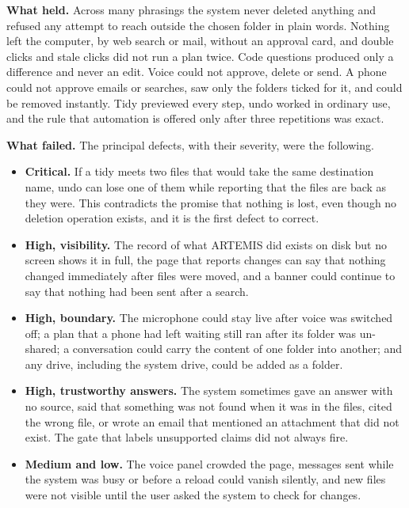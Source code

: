 \documentclass{FastFyp}
\begin{document}
\textbf{What held.} Across many phrasings the system never deleted anything and refused any attempt to reach outside the chosen folder in plain words. Nothing left the computer, by web search or mail, without an approval card, and double clicks and stale clicks did not run a plan twice. Code questions produced only a difference and never an edit. Voice could not approve, delete or send. A phone could not approve emails or searches, saw only the folders ticked for it, and could be removed instantly. Tidy previewed every step, undo worked in ordinary use, and the rule that automation is offered only after three repetitions was exact.

\textbf{What failed.} The principal defects, with their severity, were the following.
\begin{itemize}
    \item \textbf{Critical.} If a tidy meets two files that would take the same destination name, undo can lose one of them while reporting that the files are back as they were. This contradicts the promise that nothing is lost, even though no deletion operation exists, and it is the first defect to correct.
    \item \textbf{High, visibility.} The record of what ARTEMIS did exists on disk but no screen shows it in full, the page that reports changes can say that nothing changed immediately after files were moved, and a banner could continue to say that nothing had been sent after a search.
    \item \textbf{High, boundary.} The microphone could stay live after voice was switched off; a plan that a phone had left waiting still ran after its folder was un-shared; a conversation could carry the content of one folder into another; and any drive, including the system drive, could be added as a folder.
    \item \textbf{High, trustworthy answers.} The system sometimes gave an answer with no source, said that something was not found when it was in the files, cited the wrong file, or wrote an email that mentioned an attachment that did not exist. The gate that labels unsupported claims did not always fire.
    \item \textbf{Medium and low.} The voice panel crowded the page, messages sent while the system was busy or before a reload could vanish silently, and new files were not visible until the user asked the system to check for changes.
\end{itemize}
\end{document}
